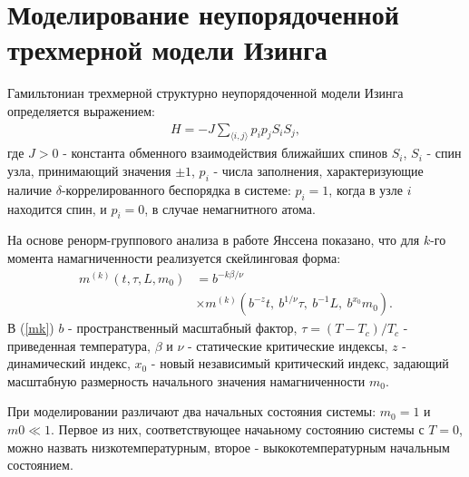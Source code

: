 \documentclass[12pt,a4paper]{article}
\begin{document}
\section[3D модель Изинга]{Моделирование неупорядоченной трехмерной модели Изинга}

Гамильтониан трехмерной структурно неупорядоченной модели Изинга определяется выражением:
\begin{eqnarray} \label{ham}
H =-J\sum_{\langle i,j\rangle}p_i p_j S_i S_j,
\end{eqnarray}
где $J>0$ - константа обменного взаимодействия ближайших спинов $S_i$, $S_i$ - спин узла, принимающий значения $\pm 1$, $p_i$ - числа заполнения, характеризующие наличие $\delta$-коррелированного беспорядка в системе: $p_i = 1$, когда в узле $i$ находится спин, и $p_i = 0$, в случае немагнитного атома.

На основе  ренорм-группового анализа в работе Янссена \cite{lit:Janssen} показано, что для $k$-го момента намагниченности реализуется скейлинговая форма:
\begin{equation} \label{mk}
\begin{split}
m^{(k)} \left( t, \tau, L, m_0 \right) & =b^{- k\beta / \nu } \\
        & \times m^{(k)}\left( b^{-z} t, \ b^{1/\nu} \tau, \ b^{-1}L, \ b^{x_0}m_0 \right).
\end{split}
\end{equation}
В (\ref{mk}) $b$  - пространственный масштабный фактор, $\tau=(T-T_c)/T_c$ - приведенная температура, $\beta$ и $\nu$ - статические критические индексы, $z$ - динамический индекс, $x_0$ - новый независимый критический индекс, задающий масштабную размерность начального значения намагниченности $m_0$.

При моделировании различают два начальных состояния системы: $m_0 = 1$ и $m0 \ll 1$. Первое из них, соответствующее начаьному состоянию системы с $T = 0$, можно назвать низкотемпературным, второе - выкокотемпературным начальным состоянием.
\end{document}
